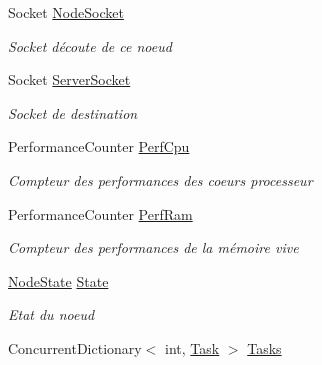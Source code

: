 \begin{DoxyCompactItemize}
Socket \hyperlink{class_node_net_1_1_network_1_1_nodes_1_1_node_a1a44ae3e6f0c93467b64142f22aa6083}{Node\+Socket}
\begin{DoxyCompactList}\small\item\em Socket d\textquotesingle{}écoute de ce noeud \end{DoxyCompactList}\item 
Socket \hyperlink{class_node_net_1_1_network_1_1_nodes_1_1_node_a1175e4cdf705317671abeeea31fd1108}{Server\+Socket}
\begin{DoxyCompactList}\small\item\em Socket de destination \end{DoxyCompactList}\item 
Performance\+Counter \hyperlink{class_node_net_1_1_network_1_1_nodes_1_1_node_a3d4435d72b766a712e4b321e050eef45}{Perf\+Cpu}
\begin{DoxyCompactList}\small\item\em Compteur des performances des coeurs processeur \end{DoxyCompactList}\item 
Performance\+Counter \hyperlink{class_node_net_1_1_network_1_1_nodes_1_1_node_a96f682af2888dbd7c8ce38a40503c247}{Perf\+Ram}
\begin{DoxyCompactList}\small\item\em Compteur des performances de la mémoire vive \end{DoxyCompactList}\item 
\hyperlink{namespace_node_net_1_1_network_1_1_states_a0c130cd0043f8c509dddba2cf1fd2f36}{Node\+State} \hyperlink{class_node_net_1_1_network_1_1_nodes_1_1_node_a7578110f73eacb630e4d63376991f51c}{State}
\begin{DoxyCompactList}\small\item\em Etat du noeud \end{DoxyCompactList}\item 
Concurrent\+Dictionary$<$ int, \hyperlink{class_node_net_1_1_tasks_1_1_task}{Task} $>$ \hyperlink{class_node_net_1_1_network_1_1_nodes_1_1_node_a20e18f64c8b3291b0670dabb1b03464f}{Tasks}

\end{DoxyCompactItemize}
